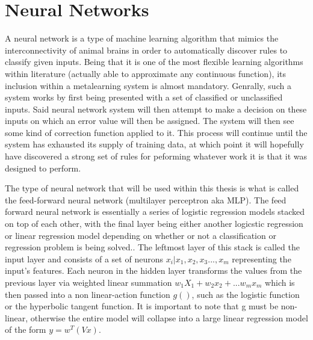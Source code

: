 {{\section{Neural Networks}
A neural network is a type of machine learning algorithm that mimics
the interconnectivity of animal brains in order to automatically
discover rules to classify given inputs. Being that it is one of the most
flexible learning algorithms within literature (actually able to
approximate any continuous function)\cite{Hornik}, its inclusion within a
metalearning system is almost mandatory.  Genrally, such a system
works by first being presented with a set of classified or
unclassified inputs. Said neural network system will then attempt to
make a decision on these inputs on which an error value will then be
assigned. The system will then see some kind of correction function
applied to it. This process will continue until the system has
exhausted its supply of training data, at which point it will
hopefully have discovered a strong set of rules for peforming whatever
work it is that it was designed to perform.

The type of neural network that will be used within this thesis is
what is called the feed-forward neural network (multilayer perceptron
aka MLP). The feed forward neural network is essentially a series of
logistic regression models stacked on top of each other, with the
final layer being either another logicstic regression or linear
regression model depending on whether or not a classification or
regression problem is being solved.\cite{Murphy}. The leftmost
layer of this stack is called the input layer and consists of a set of
neurons ${x_i|x_1,x_2,x_3...,x_m}$ representing the input's
features. Each neuron in the hidden layer transforms the values from
the previous layer via weighted linear summation $w_1X_1 + w_2x_2 +...w_mx_m$
which is then passed into a non linear-action function $g()$, such as the logistic
function or the hyperbolic tangent function. It is important to note that g must be non-linear,
otherwise the entire model will collapse into a large linear regression model of
the form $y = w^T(Vx)$. \cite{Murphy}

}}
